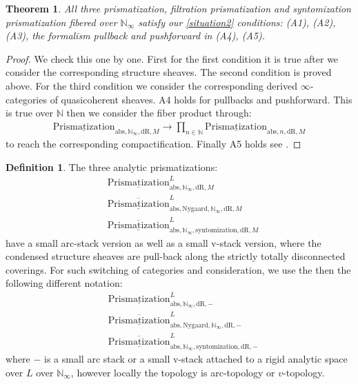 \documentclass[12pt]{article}
\newtheorem{theorem}{Theorem}
\theoremstyle{definition}
\newtheorem{definition}{Definition}
\begin{document}
\begin{theorem}
All three prismatization, filtration prismatization and syntomization prismatization fibered over $\mathbb{N}_\infty$ satisfy our \cref{situation2} conditions: (A1), (A2), (A3), the formalism pullback and pushforward in (A4), (A5).
\end{theorem}


\begin{proof}
We check this one by one. First for the first condition it is true after we consider the corresponding structure sheaves. The second condition is proved above. For the third condition we consider the corresponding derived $\infty$-categories of quasicoherent sheaves. A4 holds for pullbacks and pushforward. This is true over $\mathbb{N}$ then we consider the fiber product through:
\begin{align}
{\underline{\mathrm{Prismatization}}}_{\mathrm{abs},\mathbb{N}_\infty,\mathrm{dR},M}\rightarrow  \prod_{n\in \mathbb{N}} {\underline{\mathrm{Prismatization}}}_{\mathrm{abs},n,\mathrm{dR},M}
\end{align}
to reach the corresponding compactification. Finally A5 holds see \cite[Chapter 4, in particular 4.7, 4.8, 4.9, 4.10]{3A}.
\end{proof}

\begin{definition}
The three analytic prismatizations:
\begin{align}
&\underline{\mathrm{Prismatization}}^L_{\mathrm{abs},\mathbb{N}_\infty,\mathrm{dR},M}\\
&\overline{\underline{\mathrm{Prismatization}}}^L_{\mathrm{abs},\mathrm{Nygaard},\mathbb{N}_\infty,\mathrm{dR},M}\\
&\overline{\underline{\mathrm{Prismatization}}}^L_{\mathrm{abs},\mathbb{N}_\infty,\mathrm{syntomization},\mathrm{dR},M}
\end{align}
have a small arc-stack version as well as a small v-stack version, where the condensed structure sheaves are pull-back along the strictly totally disconnected coverings. For such switching of categories and consideration, we use the then the following different notation:
\begin{align}
&\underline{\mathrm{Prismatization}}^L_{\mathrm{abs},\mathbb{N}_\infty,\mathrm{dR},-}\\
&\overline{\underline{\mathrm{Prismatization}}}^L_{\mathrm{abs},\mathrm{Nygaard},\mathbb{N}_\infty,\mathrm{dR},-}\\
&\overline{\underline{\mathrm{Prismatization}}}^L_{\mathrm{abs},\mathbb{N}_\infty,\mathrm{syntomization},\mathrm{dR},-}
\end{align}
where $-$ is a small arc stack or a small v-stack attached to a rigid analytic space over $L$ over $\mathbb{N}_\infty$, however locally the topology is arc-topology or $v$-topology.
\end{definition}
\end{document}
